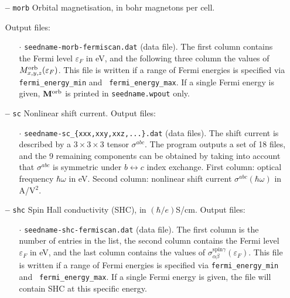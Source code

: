 \begin{itemize}
\begin{itemize}
\end{itemize}

\item[{\bf --}] \verb#morb# Orbital magnetisation, in bohr magnetons
  per cell.

Output files:

\begin{itemize}

\item[$\cdot$] {\tt seedname-morb-fermiscan.dat} (data file). The
  first column contains the Fermi level $\varepsilon_F$ in eV, and the
  following three column the values of $M^{\rm
    orb}_{x,y,z}(\varepsilon_F)$.  This file is written if a range of
  Fermi energies is specified via {\tt fermi\_energy\_min} and {\tt
    fermi\_energy\_max}.  If a single Fermi energy is given, ${\bf
    M}^{\rm orb}$ is printed in {\tt seedname.wpout} only.

\end{itemize}

\item[{\bf --}] \verb#sc# Nonlinear shift current. Output files:

\begin{itemize}

\item[$\cdot$] {\tt seedname-sc\_{\{xxx,xxy,xxz,...\}.dat}}
  (data files).  The shift current is described by a $3\times3\times3$ tensor $\sigma^{abc}$. 
  The program outputs a set of 18 files, and the 9 remaining components 
  can be obtained by taking into account that $\sigma^{abc}$ is 
  symmetric under $b\leftrightarrow c$ index exchange.
  First column: optical frequency $\hbar\omega$ in
  eV. Second column: nonlinear shift current $\sigma^{abc}(\hbar\omega)$ in A/V$^{2}$. 
  
\end{itemize}

\item[{\bf --}] \verb#shc# Spin Hall conductivity (SHC), in $(\hbar/e)$S/cm.  Output files:

	\begin{itemize}
	
	\item[$\cdot$] {\tt seedname-shc-fermiscan.dat} (data file). The
	first column is the number of entries in the list, the second column contains the Fermi level $\varepsilon_F$ in eV, and the
	last column contains the values of
	$\sigma_{\alpha\beta}^{\text{spin}\gamma}(\varepsilon_F)$.  This file is written if a range of
	Fermi energies is specified via {\tt fermi\_energy\_min} and {\tt
		fermi\_energy\_max}.  If a single Fermi energy is given, the file will contain SHC at this specific energy.
	

\end{itemize}
\end{itemize}
